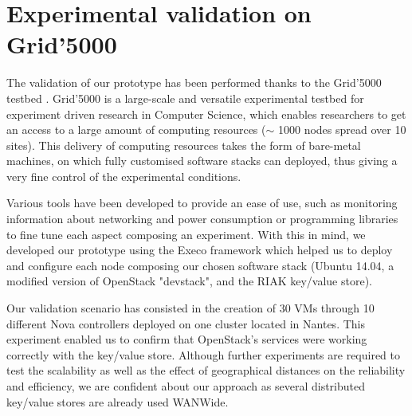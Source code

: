 \section{Experimental validation on Grid'5000}
\label{sec:eval}

The validation of our prototype has been performed thanks to the Grid'5000
testbed \cite{grid5000}. Grid'5000 is a large-scale and versatile experimental
testbed for experiment driven research in Computer Science, which enables
researchers to get an access to a large amount of computing resources
($\sim$ 1000 nodes spread over 10 sites). This delivery of computing resources
takes the form of bare-metal machines, on which fully customised software stacks
can deployed, thus giving a very fine control of the experimental conditions.

Various tools have been developed to provide an ease of use, such as monitoring
information about networking and power consumption or programming libraries to
fine tune each aspect composing an experiment. With this in mind, we developed
our prototype using the Execo framework \cite{imbert:hal-00861886} which helped
us to deploy and configure each node composing our chosen software stack (Ubuntu
14.04, a modified version of OpenStack "devstack", and the RIAK key/value store).

Our validation scenario has consisted in the creation of 30 VMs
through 10 different Nova controllers deployed on one cluster located
in Nantes. This experiment enabled us to confirm that OpenStack's
services were working correctly with the key/value store.
Although further experiments are
required to test the scalability as well as the effect
of geographical distances on the reliability and efficiency, we are
confident about our approach as several distributed key/value stores
are already used WANWide.




